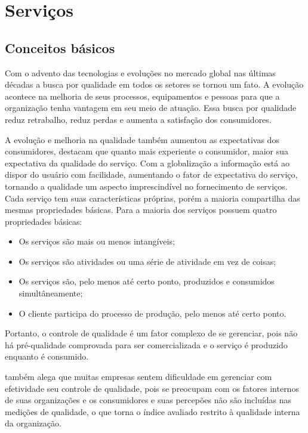 \chapter[Serviços]{Serviços}
\section{Conceitos básicos}

Com o advento das tecnologias e evoluções no mercado global nas últimas décadas a busca por qualidade em todos os setores se tornou um fato. A evolução acontece na melhoria de seus processos, equipamentos e pessoas para que a organização tenha vantagem em seu meio de atuação. Essa busca por qualidade reduz retrabalho, reduz perdas e aumenta a satisfação dos consumidores. \cite[p.~150]{slack2002}

A evolução e melhoria na qualidade também aumentou as expectativas dos consumidores, \cite [p.~42]{parasuraman1991} destacam que quanto mais experiente o consumidor, maior sua expectativa da qualidade do serviço. Com a globalização a informação está ao dispor do usuário com facilidade, aumentando o fator de expectativa do serviço, tornando a qualidade um aspecto imprescindível no fornecimento de serviços. Cada serviço tem suas características próprias, porém a maioria compartilha das mesmas propriedades básicas. Para  a maioria dos serviços possuem quatro propriedades básicas:
\begin{itemize}
	\item Os serviços são mais ou menos intangíveis;
	\item Os serviços são atividades ou uma série de atividade em vez de coisas;
	\item Os serviços são, pelo menos até certo ponto, produzidos e consumidos simultâneamente;
	\item O cliente participa do processo de produção, pelo menos até certo ponto.
\end{itemize}


Portanto, o controle de qualidade é um fator complexo de se gerenciar, pois não há pré-qualidade comprovada para ser comercializada e o serviço é produzido enquanto é consumido.

\cite[p.~47]{gronroos1993} também alega que muitas empresas sentem dificuldade em gerenciar com efetividade seu controle de qualidade, pois se preocupam com os fatores internos de suas organizações e os consumidores e suas percepões não são incluídas nas medições de qualidade, o que torna o índice avaliado restrito à qualidade interna da organização.

